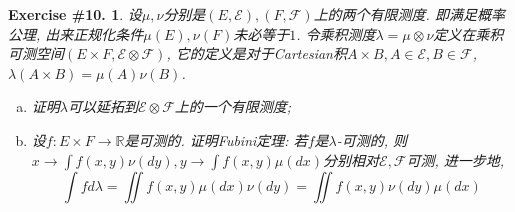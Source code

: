 \documentclass[UTF8, a4paper]{article}
\newtheorem{exercise}{Exercise \#10.}
\begin{document}
\begin{framed}
\begin{exercise}
设\(\mu, \nu\)分别是\((E,\mathcal{E}), (F, \mathcal{F})\)上的两个有限测度. 即满足概率公理, 出来正规化条件\(\mu(E), \nu(F)\)未必等于\(1\).
令乘积测度\(\lambda = \mu \otimes \nu\)定义在乘积可测空间\((E\times F, \mathcal{E} \otimes \mathcal{F})\), 它的定义是对于Cartesian积\(A\times B, A\in \mathcal{E}, B\in \mathcal{F}\), \(\lambda(A\times B) = \mu(A)\nu(B)\).

\begin{enumerate}[a)]
    \item 证明\(\lambda\)可以延拓到\(\mathcal{E} \otimes \mathcal{F}\)上的一个有限测度;
    \item 设\(f: E\times F \to \mathbb{R}\)是可测的. 证明Fubini定理: 若\(f\)是\(\lambda\)-可测的, 则\(x\to \int f(x,y) \nu(dy), y\to \int f(x,y) \mu(dx)\)分别相对\(\mathcal{E}, \mathcal{F}\)可测, 进一步地, 
$$
\int f d \lambda=\iint f(x, y) \mu(d x) \nu(d y)=\iint f(x, y) \nu(d y) \mu(d x)
$$
\end{enumerate}
\end{exercise}
\end{framed}
\end{document}
